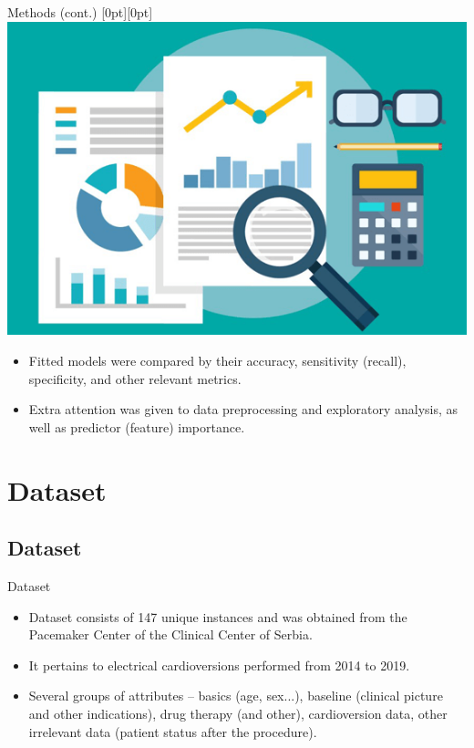 \documentclass[hyperref={bookmarks=false}]{beamer}
\newcommand{\lenitem}[2][.51\linewidth]{\parbox[t]{#1}{\strut #2\strut}}
\begin{document}
\begin{frame}{Methods (cont.)}
\mbox{}\hfill\raisebox{-\height}[0pt][0pt]{\includegraphics[width=.42\linewidth]{../slike/data.png}}
\vspace*{-\baselineskip}

\begin{itemize}
    \item \lenitem{Fitted models were compared by their accuracy, sensitivity (recall), specificity, and other relevant metrics.}
    \item \lenitem{Extra attention was given to data preprocessing and exploratory analysis, as well as predictor (feature) importance.}
\end{itemize}
\end{frame}

\section{Dataset}
\subsection{Dataset}
\begin{frame}{Dataset}
\begin{itemize}
    \item Dataset consists of 147 unique instances and was obtained from the Pacemaker Center of the Clinical Center of Serbia.

    \item It pertains to electrical cardioversions performed from 2014 to 2019.

    \item Several groups of attributes -- basics (age, sex...), baseline (clinical picture and other indications), drug therapy (and other), cardioversion data, other irrelevant data (patient status after the procedure).
\end{itemize}
\end{frame}
\end{document}
